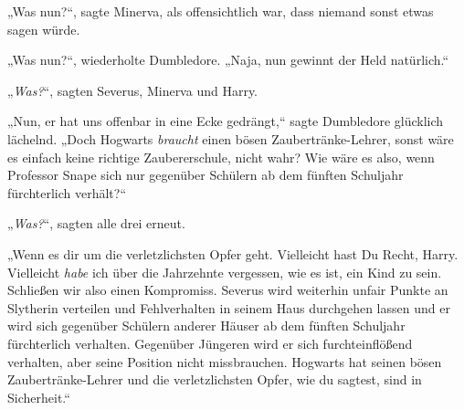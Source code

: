 „Was nun?“, sagte Minerva, als offensichtlich war, dass niemand sonst etwas sagen würde.

„Was nun?“, wiederholte Dumbledore. „Naja, nun gewinnt der Held natürlich.“

„\emph{Was?}“, sagten Severus, Minerva und Harry.

„Nun, er hat uns offenbar in eine Ecke gedrängt,“ sagte Dumbledore glücklich lächelnd. „Doch Hogwarts \emph{braucht} einen bösen Zaubertränke-Lehrer, sonst wäre es einfach keine richtige Zaubererschule, nicht wahr? Wie wäre es also, wenn Professor Snape sich nur gegenüber Schülern ab dem fünften Schuljahr fürchterlich verhält?“

„\emph{Was?}“, sagten alle drei erneut.

„Wenn es dir um die verletzlichsten Opfer geht. Vielleicht hast Du Recht, Harry. Vielleicht \emph{habe} ich über die Jahrzehnte vergessen, wie es ist, ein Kind zu sein. Schließen wir also einen Kompromiss. Severus wird weiterhin unfair Punkte an Slytherin verteilen und Fehlverhalten in seinem Haus durchgehen lassen und er wird sich gegenüber Schülern anderer Häuser ab dem fünften Schuljahr fürchterlich verhalten. Gegenüber Jüngeren wird er sich furchteinflößend verhalten, aber seine Position nicht missbrauchen. Hogwarts hat seinen bösen Zaubertränke-Lehrer und die verletzlichsten Opfer, wie du sagtest, sind in Sicherheit.“

